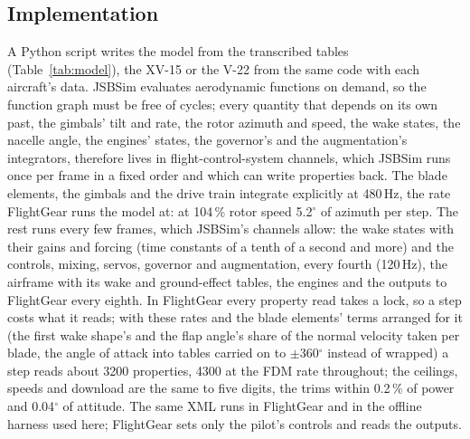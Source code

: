 \documentclass[10pt,a4paper,twocolumn]{article}
\newcommand{\Tab}[1]{}
\begin{document}
\subsection{Implementation}
A Python script writes the model from the transcribed tables (Table~\ref{tab:model}), the XV-15 or the V-22 from the same code
with each aircraft's data. JSBSim evaluates aerodynamic functions on demand, so the function graph must be free of cycles; every
quantity that depends on its own past, the gimbals' tilt and rate, the rotor azimuth and speed, the wake states, the nacelle angle,
the engines' states, the governor's and the augmentation's integrators, therefore lives in flight-control-system channels, which
JSBSim runs once per frame in a fixed order and which can write properties back. The blade elements, the gimbals and the drive
train integrate explicitly at 480\,Hz, the rate FlightGear runs the model at: at 104\,\% rotor speed 5.2$^\circ$ of azimuth per
step. The rest runs every few frames, which JSBSim's channels allow: the wake states with their gains and forcing (time constants
of a tenth of a second and more) and the controls, mixing, servos, governor and augmentation, every fourth (120\,Hz), the airframe
with its wake and ground-effect tables, the engines and the outputs to FlightGear every eighth. In FlightGear every property read
takes a lock, so a step costs what it reads; with these rates and the blade elements' terms arranged for it (the first wake
shape's and the flap angle's share of the normal velocity taken per blade, the angle of attack into tables carried on to
$\pm$360$^\circ$ instead of wrapped) a step reads about 3200 properties, 4300 at the FDM rate throughout; the ceilings, speeds and
download are the same to five digits, the trims within 0.2\,\% of power and 0.04$^\circ$ of attitude. The same XML runs in FlightGear and in the
offline harness used here; FlightGear sets only the pilot's controls and reads the outputs.

\begin{table}[t]
\centering\small
\caption{The generated V-22 model: JSBSim system files, their content and the number of named aerodynamic functions or
control-system components.}\label{tab:model}
\Tab{model}
\end{table}
\end{document}
